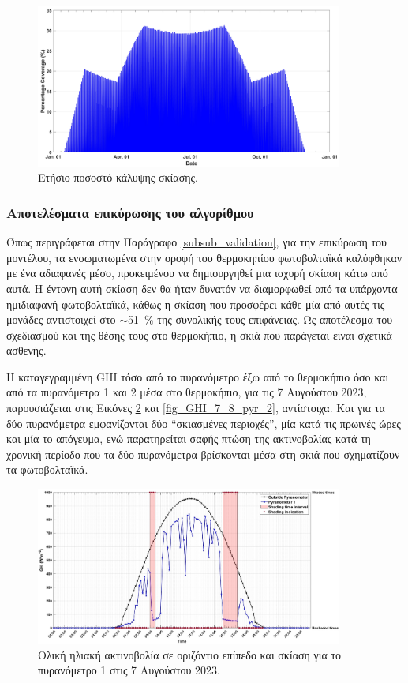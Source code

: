 \documentclass[12pt, a4paper]{report} %
\newcommand{\english}{\foreignlanguage{english}}
\begin{document}
\begin{figure}[ht]%
    \centering
    \includegraphics[width=0.9\textwidth]{Figures/annual_perc.jpg}
    \caption{Ετήσιο ποσοστό κάλυψης σκίασης.}
    \label{fig_annual_perc}
\end{figure}

\subsubsection{Αποτελέσματα επικύρωσης του αλγορίθμου}\label{subsub_alg_valid}

Όπως περιγράφεται στην Παράγραφο \ref{subsub_validation}, για την επικύρωση του μοντέλου, τα ενσωματωμένα στην οροφή 
του θερμοκηπίου φωτοβολταϊκά καλύφθηκαν με ένα αδιαφανές μέσο, προκειμένου να δημιουργηθεί μια ισχυρή σκίαση κάτω από 
αυτά. Η έντονη αυτή σκίαση δεν θα ήταν δυνατόν να διαμορφωθεί από τα υπάρχοντα ημιδιαφανή φωτοβολταϊκά, κάθως η σκίαση 
που προσφέρει κάθε μία από αυτές τις μονάδες αντιστοιχεί στο $\sim$\SI{51}{\percent} της συνολικής τους επιφάνειας. Ως 
αποτέλεσμα του σχεδιασμού και της θέσης τους στο θερμοκήπιο, η σκιά που παράγεται είναι σχετικά ασθενής.

Η καταγεγραμμένη \english{GHI} τόσο από το πυρανόμετρο έξω από το θερμοκήπιο όσο και 
από τα πυρανόμετρα 1 και 2 μέσα στο θερμοκήπιο, για τις 7 Αυγούστου 2023, παρουσιάζεται στις Εικόνες 
\ref{fig_GHI_7_8_pyr_1} και \ref{fig_GHI_7_8_pyr_2}, αντίστοιχα. Και για τα δύο πυρανόμετρα εμφανίζονται δύο “σκιασμένες 
περιοχές”, μία κατά τις πρωινές ώρες και μία το απόγευμα, ενώ παρατηρείται σαφής πτώση της ακτινοβολίας κατά τη χρονική 
περίοδο που τα δύο πυρανόμετρα βρίσκονται μέσα στη σκιά που σχηματίζουν τα φωτοβολταϊκά.

\begin{figure}[ht]%
    \centering
    \includegraphics[width=0.9\textwidth]{Figures/GHI_7_8_pyr_1.jpg}
    \caption{Ολική ηλιακή ακτινοβολία σε οριζόντιο επίπεδο και σκίαση για το πυρανόμετρο 1 στις 7 Αυγούστου 2023.}
    \label{fig_GHI_7_8_pyr_1}
\end{figure}
\end{document}

